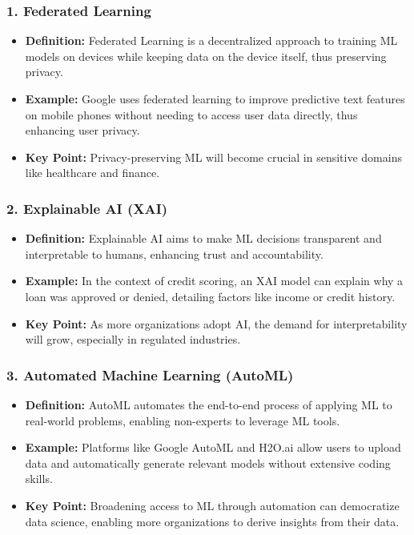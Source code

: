 \documentclass[aspectratio=169]{beamer}
\begin{document}
\begin{frame}[fragile]
    \frametitle{1. Federated Learning}
    \begin{itemize}
        \item \textbf{Definition:} Federated Learning is a decentralized approach to training ML models on devices while keeping data on the device itself, thus preserving privacy.
        
        \item \textbf{Example:} Google uses federated learning to improve predictive text features on mobile phones without needing to access user data directly, thus enhancing user privacy.
        
        \item \textbf{Key Point:} Privacy-preserving ML will become crucial in sensitive domains like healthcare and finance.
    \end{itemize}
\end{frame}

\begin{frame}[fragile]
    \frametitle{2. Explainable AI (XAI)}
    \begin{itemize}
        \item \textbf{Definition:} Explainable AI aims to make ML decisions transparent and interpretable to humans, enhancing trust and accountability.
        
        \item \textbf{Example:} In the context of credit scoring, an XAI model can explain why a loan was approved or denied, detailing factors like income or credit history.
        
        \item \textbf{Key Point:} As more organizations adopt AI, the demand for interpretability will grow, especially in regulated industries.
    \end{itemize}
\end{frame}

\begin{frame}[fragile]
    \frametitle{3. Automated Machine Learning (AutoML)}
    \begin{itemize}
        \item \textbf{Definition:} AutoML automates the end-to-end process of applying ML to real-world problems, enabling non-experts to leverage ML tools.
        
        \item \textbf{Example:} Platforms like Google AutoML and H2O.ai allow users to upload data and automatically generate relevant models without extensive coding skills.
        
        \item \textbf{Key Point:} Broadening access to ML through automation can democratize data science, enabling more organizations to derive insights from their data.
    \end{itemize}
\end{frame}
\end{document}
